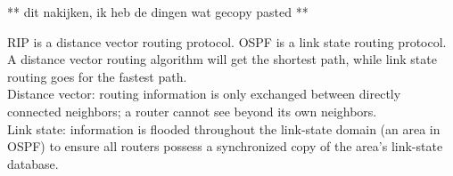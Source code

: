** dit nakijken, ik heb de dingen wat gecopy pasted **

RIP is a distance vector routing protocol. OSPF is a link state routing protocol. \\
A distance vector routing algorithm will get the shortest path, while link state routing goes for the fastest path. \\

Distance vector: routing information is only exchanged between directly connected neighbors; a router cannot see beyond its own neighbors. \\
Link state: information is flooded throughout the link-state domain (an area in OSPF) to ensure all routers possess a synchronized copy of the area's link-state database.

